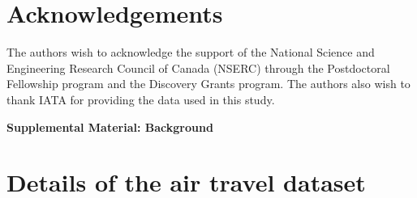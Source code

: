 \documentclass[preprint,times]{elsarticle}
\def\mfabian#1{{\color{black} #1}}
\begin{document}


\section*{Acknowledgements}

\mfabian{The authors wish to acknowledge the support of the National Science and Engineering Research Council of Canada (NSERC) through the Postdoctoral Fellowship program and the Discovery Grants program. The authors also wish to thank IATA for providing the data used in this study.}







\onecolumn
\pagebreak
\begin{center}
\textbf{\large Supplemental Material: Background}
\end{center}
\setcounter{equation}{0}
\setcounter{figure}{0}
\setcounter{table}{0}
\setcounter{section}{0}
\setcounter{page}{1}
\makeatletter
\renewcommand{\theequation}{S.\arabic{equation}}
\renewcommand{\thefigure}{S.\Roman{figure}}
\renewcommand{\thetable}{S.\Roman{table}}
\renewcommand{\thesection}{S.\Roman{section}}

\section{Details of the air travel dataset} \label{sec:data}
\end{document}
